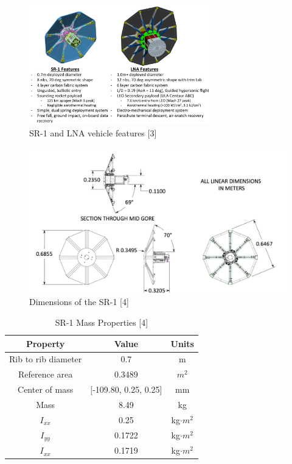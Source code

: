 \documentclass[12pt]{article}
\numberwithin{equation}{section}
\numberwithin{figure}{section}
\numberwithin{table}{section}
\begin{document}
\begin{figure}[h]
  \centering
  \includegraphics[width=0.7\textwidth]{SR-1 LNA Specs LNA Vehicle Concept.png}
  \caption{SR-1 and LNA vehicle features [3]}
  \label{fig:SR1_LNA}
\end{figure}

\begin{figure}[h]
  \centering
  \includegraphics[width=1\textwidth]{Figures/SR-1 Dimensions Subsonic Dynamic Testing.png}
  \caption{Dimensions of the SR-1 [4]}
  \label{fig:SR1_Dims}
\end{figure}

\begin{table}
\begin{center}
\caption{SR-1 Mass Properties [4]}
\begin{tabular}{|c|c|c|}
\hline
\textbf{Property} & \textbf{Value} & \textbf{Units} \\
\hline
Rib to rib diameter & 0.7 & m\\
\hline
Reference area & 0.3489 & $m^2$\\
\hline
Center of mass & [-109.80, 0.25, 0.25] & mm\\
\hline
Mass & 8.49 & kg\\
\hline
$I_{xx}$ & 0.25 & kg$\cdot m^2$\\
\hline
$I_{yy}$ & 0.1722 & kg$\cdot m^2$\\
\hline
$I_{xx}$ & 0.1719 & kg$\cdot m^2$\\
\hline
\end{tabular}
\end{center}
\end{table}
\end{document}
